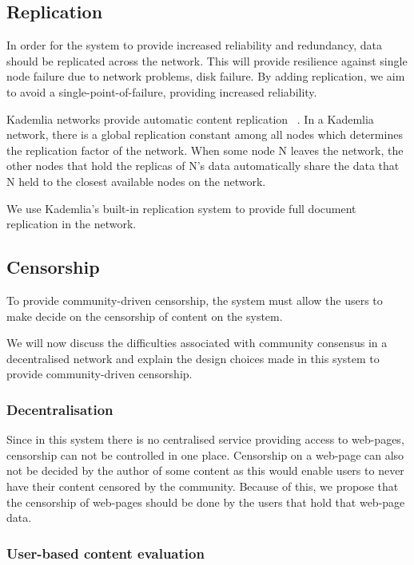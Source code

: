 \subsection{Replication}


In order for the system to provide increased reliability and redundancy, data should be replicated across the network.
This will provide resilience against single node failure due to network problems, disk failure. By adding replication, we aim to
avoid a single-point-of-failure, providing increased reliability.

Kademlia networks provide automatic content replication ~\cite{kademlia}. In a Kademlia network, there is a global replication constant among all nodes
which determines the replication factor of the network. When some node N leaves the network, the other nodes that hold the replicas of
N's data automatically share the data that N held to the closest available nodes on the network.

We use Kademlia's built-in replication system to provide full document replication in the network.


\subsection{Censorship}

To provide community-driven censorship, the system must allow the users to make decide on the censorship of content on the system.

We will now discuss the difficulties associated with community consensus in a decentralised network and explain the
design choices made in this system to provide community-driven censorship.

\subsubsection{Decentralisation}

Since in this system there is no centralised service providing access to web-pages, censorship can not be controlled in one place.
Censorship on a web-page can also not be decided by the author of some content as this would enable users to never have their
content censored by the community.
Because of this, we propose that the censorship of web-pages should be done by the users that hold that web-page data.

\subsubsection{User-based content evaluation}


